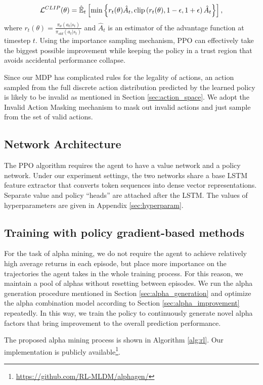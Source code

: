 \begin{equation}
    \mathcal{L}^{CLIP}(\theta) = \hat{\mathbb{E}}_{t}\left[\min\left\lbrace r_t(\theta)\hat{A}_{t},\mathrm{clip}\left(r_t(\theta), 1-\epsilon, 1+\epsilon\right)\hat{A}_{t}\right\rbrace\right],
\end{equation}
where $r_t(\theta)=\frac{\pi_\theta(a_t | s_t)}{\pi_{old}(a_t | s_t)}$ and $\hat{A}_t$ is an estimator of the advantage function at timestep $t$. Using the importance sampling mechanism, PPO can effectively take the biggest possible improvement while keeping the policy in a trust region that avoids accidental performance collapse.

Since our MDP has complicated rules for the legality of actions, an action sampled from the full discrete action distribution predicted by the learned policy is likely to be invalid as mentioned in Section \ref{sec:action_space}. We adopt the Invalid Action Masking mechanism \cite{ppomask} to mask out invalid actions and just sample from the set of valid actions.

\subsection{Network Architecture}

The PPO algorithm requires the agent to have a value network and a policy network. Under our experiment settings, the two networks share a base LSTM feature extractor that converts token sequences into dense vector representations. Separate value and policy ``heads'' are attached after the LSTM. The values of hyperparameters are given in Appendix \ref{sec:hyperparam}.

\subsection{Training with policy gradient-based methods}

For the task of alpha mining, we do not require the agent to achieve relatively high average returns in each episode, but place more importance on the trajectories the agent takes in the whole training process. For this reason, we maintain a pool of alphas without resetting between episodes. We run the alpha generation procedure mentioned in Section \ref{sec:alpha_generation} and optimize the alpha combination model according to Section \ref{sec:alpha_improvement} repeatedly. In this way, we train the policy to continuously generate novel alpha factors that bring improvement to the overall prediction performance.

The proposed alpha mining process is shown in Algorithm \ref{alg:rl}. Our implementation is publicly available\footnote{ \url{https://github.com/RL-MLDM/alphagen/}}.

